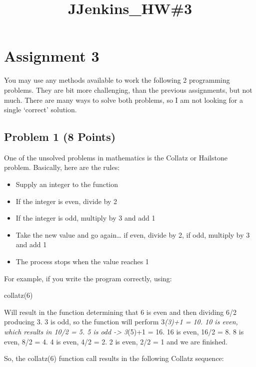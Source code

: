 \documentclass[11pt]{article}
\title{JJenkins\_HW\#3}
\providecommand{\tightlist}{%
      \setlength{\itemsep}{0pt}\setlength{\parskip}{0pt}}
\begin{document}
    
    
    \maketitle
    
    

    
    \hypertarget{assignment-3}{%
\section{Assignment 3}\label{assignment-3}}

You may use any methods available to work the following 2 programming
problems. They are bit more challenging, than the previous assignments,
but not much. There are many ways to solve both problems, so I am not
looking for a single `correct' solution.

\hypertarget{problem-1-8-points}{%
\subsection{Problem 1 (8 Points)}\label{problem-1-8-points}}

One of the unsolved problems in mathematics is the Collatz or Hailstone
problem. Basically, here are the rules:

\begin{itemize}
\tightlist
\item
  Supply an integer to the function
\item
  If the integer is even, divide by 2
\item
  If the integer is odd, multiply by 3 and add 1
\item
  Take the new value and go again\ldots{} if even, divide by 2, if odd,
  multiply by 3 and add 1
\item
  The process stops when the value reaches 1
\end{itemize}

For example, if you write the program correctly, using:

collatz(6)

Will result in the function determining that 6 is even and then dividing
6/2 producing 3. 3 is odd, so the function will perform 3\emph{(3)+1 =
10. 10 is even, which results in 10/2 = 5. 5 is odd -\textgreater{}
3}(5)+1 = 16. 16 is even, 16/2 = 8. 8 is even, 8/2 = 4. 4 is even, 4/2 =
2. 2 is even, 2/2 = 1 and we are finished.

So, the collatz(6) function call results in the following Collatz
sequence:
\end{document}
